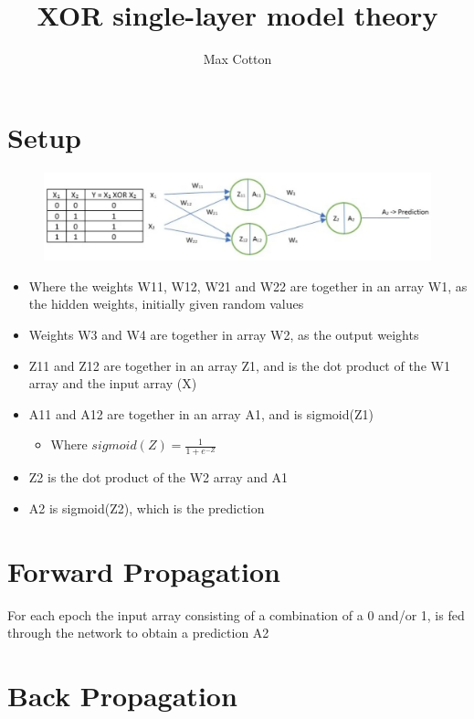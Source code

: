 \documentclass[10pt,a4paper]{article}
\title{XOR single-layer model theory}
\author{Max Cotton}
\date{}
\begin{document}
\maketitle

\section{Setup}

\begin{figure}[h!]
\centering
\includegraphics[width=1\textwidth]{src/images/xor-ann-diagram.png}
\end{figure}

\begin{itemize}
    \item Where the weights W11, W12, W21 and W22 are together in an array W1, as the hidden weights, initially given random values
    \item Weights W3 and W4 are together in array W2, as the output weights
    \item Z11 and Z12 are together in an array Z1, and is the dot product of the W1 array and the input array (X)
    \item A11 and A12 are together in an array A1, and is sigmoid(Z1)
    \begin{itemize}
        \item Where $sigmoid(Z) = \frac{1}{1+e^{-Z}}$
    \end{itemize}
    \item Z2 is the dot product of the W2 array and A1
    \item A2 is sigmoid(Z2), which is the prediction
\end{itemize}

\section{Forward Propagation}
For each epoch the input array consisting of a combination of a 0 and/or 1, is fed through the network to obtain a prediction A2

\section{Back Propagation}
\end{document}
